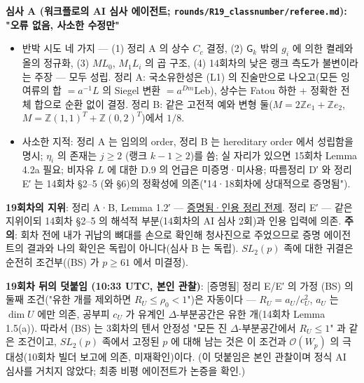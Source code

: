\textbf{심사 A (워크플로의 AI 심사 에이전트; \texttt{rounds/R19\_classnumber/referee.md}): "오류 없음, 사소한 수정만"}

\begin{itemize}
\tightlist
\item
  반박 시도 네 가지 --- (1) 정리 A 의 상수 \(C_c\) 결정, (2) \(\mathsf G_k\) 밖의 \(g_i\) 에 의한 켤레와 올의 정규화, (3) \(ML_0\), \(M_1L_i\) 의 곱 구조, (4) 14회차의 낮은 랭크 측도가 불변이라는 주장 --- 모두 성립. 정리 A: 국소유한성은 (L1) 의 진술만으로 나오고(모든 잉여류의 합 \(=a^{-1}L\) 의 Siegel 변환 \(=a^{Dm}\mathrm{Leb}\)), 상수는 Fatou 하한 + 정확한 전체 합으로 순환 없이 결정. 정리 B: 같은 고전적 예와 변형 둘(\(M=2\mathbb Ze_1+\mathbb Ze_2\), \(M=\mathbb Z(1,1)^T+\mathbb Z(0,2)^T\))에서 \(1/8\).
\item
  사소한 지적: 정리 A 는 임의의 order, 정리 B 는 hereditary order 에서 성립함을 명시; \(\eta_i\) 의 존재는 \(j\ge2\) (랭크 \(k-1\ge2\))를 씀; 실 자리가 있으면 15회차 Lemma 4.2a 필요; 비자유 \(L\) 에 대한 D.9 의 언급은 미증명·미사용; 따름정리 D′ 와 정리 E′ 는 14회차 §2--5 (와 §6)의 정확성에 의존("14·18회차에 상대적으로 증명됨").
\end{itemize}

\textbf{19회차의 지위}: 정리 A·B, Lemma 1.2′ --- \href{AI\%20심사\%202회}{증명됨·인용 정리 전제}. 정리 E′ --- 같은 지위이되 14회차 §2--5 의 해석적 부분(14회차의 AI 심사 2회)과 인용 입력에 의존. \textbf{주의}: 회차 전에 내가 귀납의 뼈대를 손으로 확인해 청사진으로 주었으므로 증명 에이전트의 결과와 나의 확인은 독립이 아니다(심사 B 는 독립). \(SL_2(p)\) 족에 대한 귀결은 순전히 조건부((BS) 가 \(p\ge61\) 에서 미결정).

\textbf{19회차 뒤의 덧붙임 (10:33 UTC, 본인 관찰)}: {[}증명됨{]} 정리 E/E′ 의 가정 (BS) 의 둘째 조건("유한 개를 제외하면 \(R_U\le\rho_0<1\)")은 자동이다 --- \(R_U=a_U/c_U^2\), \(a_U\) 는 \(\dim U\) 에만 의존, 공부피 \(c_U\) 가 유계인 \(\Delta\)-부분공간은 유한 개(14회차 Lemma 1.5(a)). 따라서 (BS) 는 3회차의 텐서 안정성 "모든 진 \(\Delta\)-부분공간에서 \(R_U\le1\)" 과 같은 조건이고, \(SL_2(p)\) 족에서 고정된 \(p\) 에 대해 남는 것은 이 조건과 \(\mathcal O(W_p)\) 의 극대성(10회차 빌더 보고에 의존, 미재확인)이다. (이 덧붙임은 본인 관찰이며 정식 AI 심사를 거치지 않았다; 최종 비평 에이전트가 논증을 확인.)

